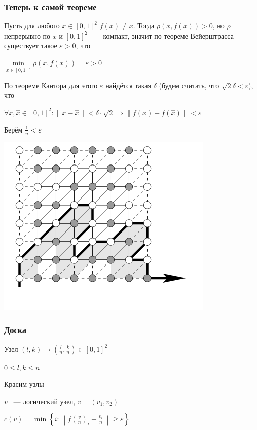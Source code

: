 \documentclass{article}
\begin{document}
		\subsubsection{Теперь к самой теореме}
				
            Пусть для любого $x \in [0, 1]^2$ $f(x) \neq x$. Тогда $\rho(x, f(x)) > 0$, но $\rho$ непрерывно по $x$ и $[0, 1]^2$ ~--- компакт, значит по теореме Вейерштрасса существует такое $\varepsilon > 0$, что
				
			$\min\limits_{x \in [0, 1]^2} \rho(x, f(x)) = \varepsilon > 0$
				
			По теореме Кантора для этого $\varepsilon$ найдётся такая $\delta$ (будем считать, что $\sqrt{2} \delta < \varepsilon$), что
				
			$\forall x, \widehat{x} \in [0, 1]^2 : \| x - \widehat{x} \| < \delta \cdot \sqrt{2} \Rightarrow \| f(x) - f(\widehat{x}) \| < \varepsilon$
				
			Берём $\frac{1}{n} < \varepsilon$
				
			\includegraphics[scale=0.45]{HEXTHEOREM.png}
				
        \subsubsection{Доска}
				
            Узел $(l, k) \rightarrow \left(\frac{l}{n}, \frac{k}{n}\right) \in [0, 1]^2$
				
			$0 \leq l, k \leq n$
				
			Красим узлы
				
			$v$ ~--- логический узел, $v = (v_1, v_2)$
				
			$c(v) = \min \left\{ i : \left\| f\left(\frac{v}{n}\right)_i - \frac{v_i}{n} \right\| \geq \varepsilon \right\}$
			
\end{document}
